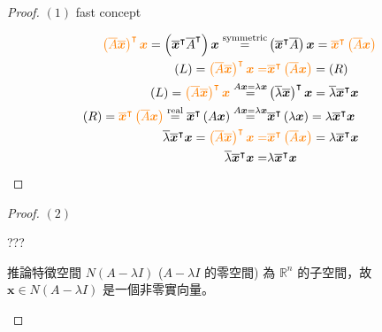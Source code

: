 \documentclass[
]{book}
\theoremstyle{definition}
\theoremstyle{definition}
\theoremstyle{definition}
\theoremstyle{definition}
\theoremstyle{remark}
\begin{document}
\begin{proof}

\(\left(1\right)\) fast concept

\[
\begin{aligned}
{\color{orange}\left(\overline{A}\overline{\boldsymbol{x}}\right)^{\intercal}\boldsymbol{x}}=\left(\overline{\boldsymbol{x}}^{\intercal}\overline{A}^{\intercal}\right)\boldsymbol{x}\overset{\text{symmetric}}{=} & \left(\overline{\boldsymbol{x}}^{\intercal}\overline{A}\right)\boldsymbol{x}={\color{orange}\overline{\boldsymbol{x}}^{\intercal}\left(\overline{A}\boldsymbol{x}\right)}\\
\left(L\right)={\color{orange}\left(\overline{A}\overline{\boldsymbol{x}}\right)^{\intercal}\boldsymbol{x}=} & {\color{orange}\overline{\boldsymbol{x}}^{\intercal}\left(\overline{A}\boldsymbol{x}\right)}=\left(R\right)\\
\left(L\right)={\color{orange}\left(\overline{A}\overline{\boldsymbol{x}}\right)^{\intercal}\boldsymbol{x}}\overset{A\boldsymbol{x}=\lambda\boldsymbol{x}}{=} & \left(\overline{\lambda}\overline{\boldsymbol{x}}\right)^{\intercal}\boldsymbol{x}=\overline{\lambda}\overline{\boldsymbol{x}}^{\intercal}\boldsymbol{x}\\
\left(R\right)={\color{orange}\overline{\boldsymbol{x}}^{\intercal}\left(\overline{A}\boldsymbol{x}\right)}\overset{\text{real}}{=}\overline{\boldsymbol{x}}^{\intercal}\left(A\boldsymbol{x}\right)\overset{A\boldsymbol{x}=\lambda\boldsymbol{x}}{=} & \overline{\boldsymbol{x}}^{\intercal}\left(\lambda\boldsymbol{x}\right)=\lambda\overline{\boldsymbol{x}}^{\intercal}\boldsymbol{x}\\
\overline{\lambda}\overline{\boldsymbol{x}}^{\intercal}\boldsymbol{x}={\color{orange}\left(\overline{A}\overline{\boldsymbol{x}}\right)^{\intercal}\boldsymbol{x}=} & {\color{orange}\overline{\boldsymbol{x}}^{\intercal}\left(\overline{A}\boldsymbol{x}\right)}=\lambda\overline{\boldsymbol{x}}^{\intercal}\boldsymbol{x}\\
\overline{\lambda}\overline{\boldsymbol{x}}^{\intercal}\boldsymbol{x}= & \lambda\overline{\boldsymbol{x}}^{\intercal}\boldsymbol{x}
\end{aligned}
\]

\end{proof}

\begin{proof}

\(\left(2\right)\)

???

\begin{CJK}{UTF8}{bsmi}
推論特徵空間 $N(A-\lambda I)$ ($A-\lambda I$ 的零空間) 為 $\mathbb{R}^n$ 的子空間，故 $\boldsymbol{x}\in N(A-\lambda I)$  是一個非零實向量。
\end{CJK}

\end{proof}
\end{document}
